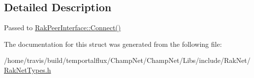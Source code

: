 \subsection{Detailed Description}
Passed to \hyperlink{class_rak_net_1_1_rak_peer_interface_a451dd5d225277fe5806d3d700551fb76}{Rak\-Peer\-Interface\-::\-Connect()} 

The documentation for this struct was generated from the following file\-:\begin{DoxyCompactItemize}
\item 
/home/travis/build/temportalflux/\-Champ\-Net/\-Champ\-Net/\-Libs/include/\-Rak\-Net/\hyperlink{_rak_net_types_8h}{Rak\-Net\-Types.\-h}\end{DoxyCompactItemize}
